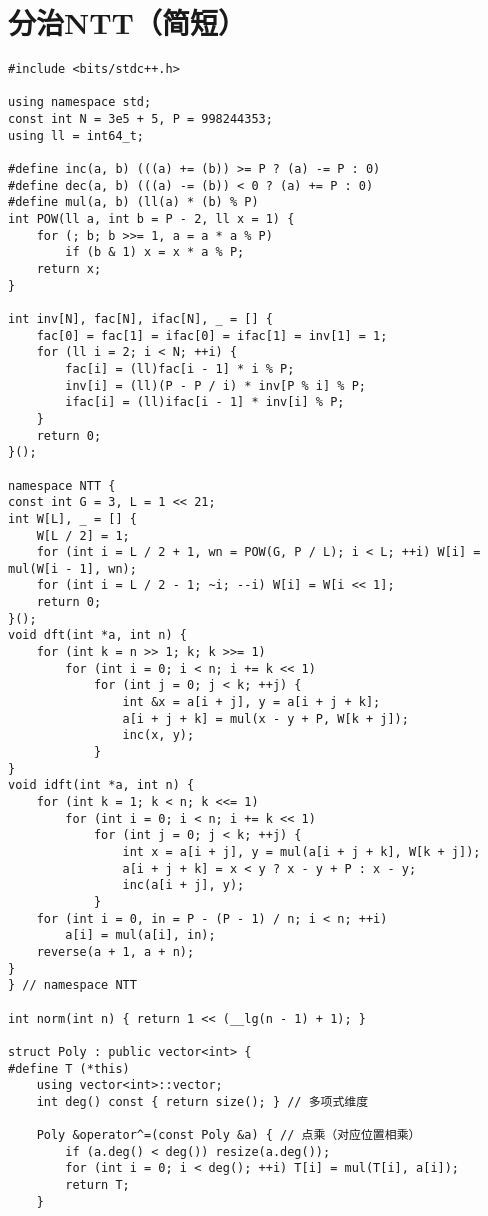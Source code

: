 \section{分治NTT（简短）}

\begin{verbatim}
#include <bits/stdc++.h>

using namespace std;
const int N = 3e5 + 5, P = 998244353;
using ll = int64_t;

#define inc(a, b) (((a) += (b)) >= P ? (a) -= P : 0)
#define dec(a, b) (((a) -= (b)) < 0 ? (a) += P : 0)
#define mul(a, b) (ll(a) * (b) % P)
int POW(ll a, int b = P - 2, ll x = 1) {
    for (; b; b >>= 1, a = a * a % P)
        if (b & 1) x = x * a % P;
    return x;
}

int inv[N], fac[N], ifac[N], _ = [] {
    fac[0] = fac[1] = ifac[0] = ifac[1] = inv[1] = 1;
    for (ll i = 2; i < N; ++i) {
        fac[i] = (ll)fac[i - 1] * i % P;
        inv[i] = (ll)(P - P / i) * inv[P % i] % P;
        ifac[i] = (ll)ifac[i - 1] * inv[i] % P;
    }
    return 0;
}();

namespace NTT {
const int G = 3, L = 1 << 21;
int W[L], _ = [] {
    W[L / 2] = 1;
    for (int i = L / 2 + 1, wn = POW(G, P / L); i < L; ++i) W[i] = mul(W[i - 1], wn);
    for (int i = L / 2 - 1; ~i; --i) W[i] = W[i << 1];
    return 0;
}();
void dft(int *a, int n) {
    for (int k = n >> 1; k; k >>= 1)
        for (int i = 0; i < n; i += k << 1)
            for (int j = 0; j < k; ++j) {
                int &x = a[i + j], y = a[i + j + k];
                a[i + j + k] = mul(x - y + P, W[k + j]);
                inc(x, y);
            }
}
void idft(int *a, int n) {
    for (int k = 1; k < n; k <<= 1)
        for (int i = 0; i < n; i += k << 1)
            for (int j = 0; j < k; ++j) {
                int x = a[i + j], y = mul(a[i + j + k], W[k + j]);
                a[i + j + k] = x < y ? x - y + P : x - y;
                inc(a[i + j], y);
            }
    for (int i = 0, in = P - (P - 1) / n; i < n; ++i)
        a[i] = mul(a[i], in);
    reverse(a + 1, a + n);
}
} // namespace NTT

int norm(int n) { return 1 << (__lg(n - 1) + 1); }

struct Poly : public vector<int> {
#define T (*this)
    using vector<int>::vector;
    int deg() const { return size(); } // 多项式维度

    Poly &operator^=(const Poly &a) { // 点乘（对应位置相乘）
        if (a.deg() < deg()) resize(a.deg());
        for (int i = 0; i < deg(); ++i) T[i] = mul(T[i], a[i]);
        return T;
    }


\end{verbatim}
